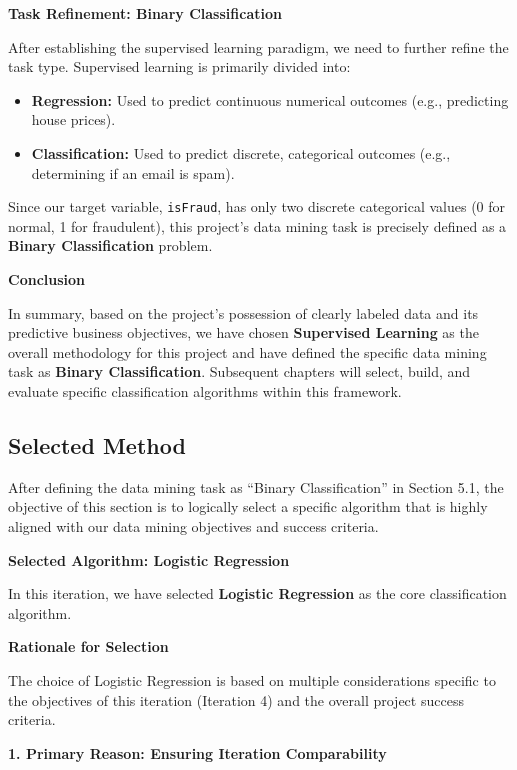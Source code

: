 \documentclass[sigplan,screen]{acmart}
\begin{document}
\textbf{Task Refinement: Binary Classification}

After establishing the supervised learning paradigm, we need to further refine the task type. Supervised learning is primarily divided into:

\begin{itemize}
\item \textbf{Regression:} Used to predict continuous numerical outcomes (e.g., predicting house prices).
\item \textbf{Classification:} Used to predict discrete, categorical outcomes (e.g., determining if an email is spam).
\end{itemize}

Since our target variable, \texttt{isFraud}, has only two discrete categorical values (0 for normal, 1 for fraudulent), this project's data mining task is precisely defined as a \textbf{Binary Classification} problem.

\textbf{Conclusion}

In summary, based on the project's possession of clearly labeled data and its predictive business objectives, we have chosen \textbf{Supervised Learning} as the overall methodology for this project and have defined the specific data mining task as \textbf{Binary Classification}. Subsequent chapters will select, build, and evaluate specific classification algorithms within this framework.

\subsection{Selected Method}

After defining the data mining task as ``Binary Classification'' in Section 5.1, the objective of this section is to logically select a specific algorithm that is highly aligned with our data mining objectives and success criteria.

\textbf{Selected Algorithm: Logistic Regression}

In this iteration, we have selected \textbf{Logistic Regression} as the core classification algorithm.

\textbf{Rationale for Selection}

The choice of Logistic Regression is based on multiple considerations specific to the objectives of this iteration (Iteration 4) and the overall project success criteria.

\textbf{1. Primary Reason: Ensuring Iteration Comparability}
\end{document}
